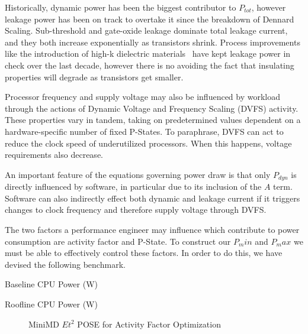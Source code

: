 Historically, dynamic power has been the biggest contributor to $P_{tot}$, however leakage power has been on track to overtake it since the breakdown of Dennard Scaling.  Sub-threshold and gate-oxide leakage dominate total leakage current, and they both increase exponentially as transistors shrink. Process improvements like the introduction of high-k dielectric materials~\cite{jan:2009aa} have kept leakage power in check over the last decade, however there is no avoiding the fact that insulating properties will degrade as transistors get smaller.

Processor frequency and supply voltage may also be influenced by workload through the actions of Dynamic Voltage and Frequency Scaling (DVFS) activity.
These properties vary in tandem, taking on predetermined values dependent on a hardware-specific number of fixed P-States.
To paraphrase, DVFS can act to reduce the clock speed of underutilized processors. When this happens, voltage requirements also decrease.

An important feature of the equations governing power draw is that only $P_{dyn}$ is directly influenced by software, in particular due to its inclusion of the $A$ term. Software can also indirectly effect both dynamic and leakage current if it triggers changes to clock frequency and therefore supply voltage through DVFS.  

The two factors a performance engineer may influence which contribute to power consumption are activity factor and P-State.
To construct our $P_min$ and $P_max$ we must be able to effectively control these factors.
In order to do this, we have devised the following benchmark.



\begin{table}
\centering

\caption{Baseline CPU Power (W)}
\end{table} 


\begin{table}
\centering

\caption{Roofline CPU Power (W)}
\end{table} 

\begin{figure}
\centering

\caption{MiniMD $Et^2$ POSE for Activity Factor Optimization}
\label{fig:minimd}
\end{figure}



